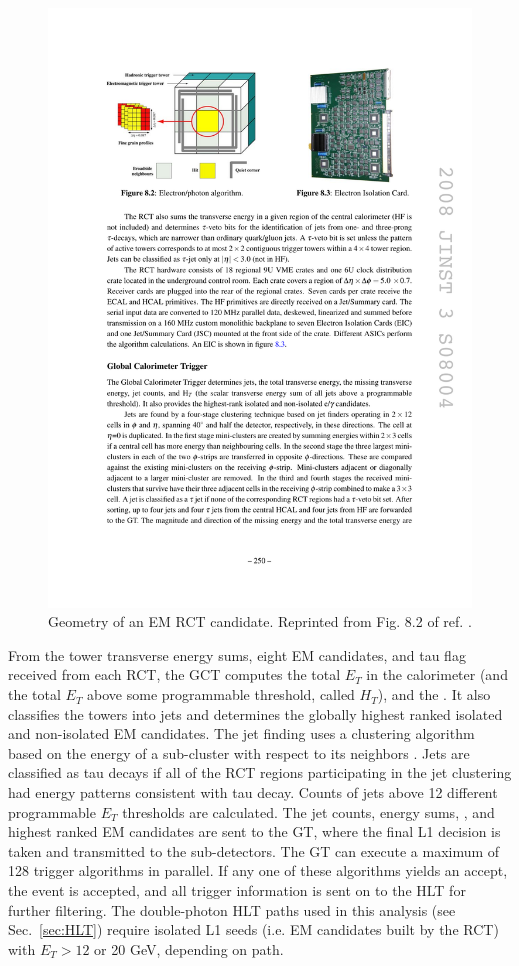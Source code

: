 \documentclass[dissertation.tex]{subfiles}
\begin{document}
\begin{figure}
	\centering
	\includegraphics[scale=1.0]{RCT_EG_candidate}
	\caption{Geometry of an EM RCT candidate.  Reprinted from Fig. 8.2 of ref. \cite{1748-0221-3-08-S08004}.}
	\label{fig:RCT_EG_candidate}
\end{figure}

From the tower transverse energy sums, eight EM candidates, and tau flag received from each RCT, the GCT computes the total $E_{T}$ in the calorimeter (and the total $E_{T}$ above some programmable threshold, called $H_{T}$), and the \MET.  It also classifies the towers into jets and determines the globally highest ranked isolated and non-isolated EM candidates.  The jet finding uses a clustering algorithm based on the energy of a sub-cluster with respect to its neighbors \cite{Smith}.  Jets are classified as tau decays if all of the RCT regions participating in the jet clustering had energy patterns consistent with tau decay.  Counts of jets above 12 different programmable $E_{T}$ thresholds are calculated.  The jet counts, energy sums, \MET, and highest ranked EM candidates are sent to the GT, where the final L1 decision is taken and transmitted to the sub-detectors.  The GT can execute a maximum of 128 trigger algorithms in parallel.  If any one of these algorithms yields an accept, the event is accepted, and all trigger information is sent on to the HLT for further filtering.  The double-photon HLT paths used in this analysis (see Sec.~\ref{sec:HLT}) require isolated L1 seeds (i.e. EM candidates built by the RCT) with $E_{T} > 12$ or 20 GeV, depending on path.
\end{document}
